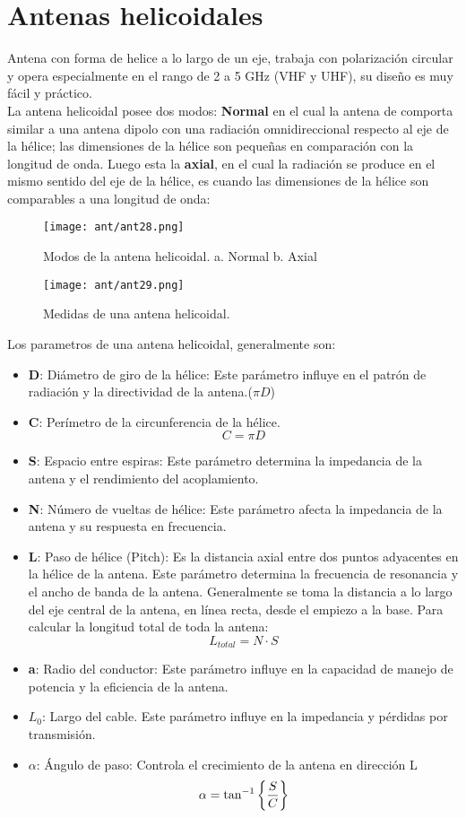 \documentclass[
	12pt, %
	fleqn, %
	a4paper, %
	oneside, %
]{LegrandOrangeBook}
\begin{document}
\section{Antenas helicoidales}
Antena con forma de helice a lo largo de un eje, trabaja con polarización circular y opera especialmente en el rango de 2 a 5 GHz (VHF y UHF), su diseño es muy fácil y práctico.\\
La antena helicoidal posee dos modos: \textbf{Normal} en el cual la antena de comporta similar a una antena dipolo con una radiación omnidireccional respecto al eje de la hélice; las dimensiones de la hélice son pequeñas en comparación con la longitud de onda. Luego esta la \textbf{axial}, en el cual la radiación se produce en el mismo sentido del eje de la hélice, es cuando las dimensiones de la hélice son comparables a una longitud de onda:
\begin{figure}[H]
\centering
\texttt{[image: ant/ant28.png]}
\caption{Modos de la antena helicoidal. a. Normal b. Axial}
\label{fig:modos heli}
\end{figure}
\begin{figure}[H]
\centering
\texttt{[image: ant/ant29.png]}
\caption{Medidas de una antena helicoidal.}
\end{figure}
Los parametros de una antena helicoidal, generalmente son:
\begin{itemize}
\item \textbf{D}: Diámetro de giro de la hélice: Este parámetro influye en el patrón de radiación y la directividad de la antena.($\pi D$)
\item \textbf{C}: Perímetro de la circunferencia de la hélice.
\begin{equation}
C=\pi D
\end{equation}
\item \textbf{S}: Espacio entre espiras: Este parámetro determina la impedancia de la antena y el rendimiento del acoplamiento.
\item \textbf{N}: Número de vueltas de hélice: Este parámetro afecta la impedancia de la antena y su respuesta en frecuencia.
\item \textbf{L}: Paso de hélice (Pitch): Es la distancia axial entre dos puntos adyacentes en la hélice de la antena. Este parámetro determina la frecuencia de resonancia y el ancho de banda de la antena. Generalmente se toma la distancia a lo largo del eje central de la antena, en línea recta, desde el empiezo a la base. Para calcular la longitud total de toda la antena:
\begin{equation}
L_{total}=N\cdot S
\end{equation}
\item \textbf{a}: Radio del conductor: Este parámetro influye en la capacidad de manejo de potencia y la eficiencia de la antena.
\item \textbf{$L_0$}: Largo del cable. Este parámetro influye en la impedancia y pérdidas por transmisión.
\item \textbf{$\alpha$}: Ángulo de paso: Controla el crecimiento de la antena en dirección L
\begin{equation}
\alpha=\tan^{-1}\left\lbrace \frac{S}{C}\right\rbrace
\end{equation}
\end{itemize}
\end{document}
